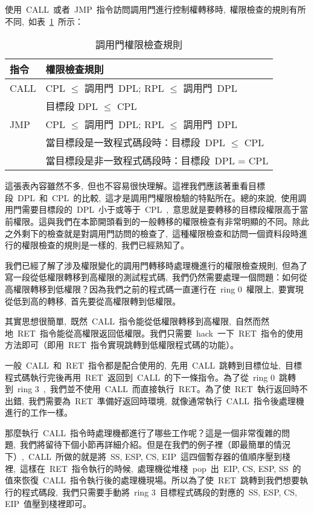 使用~CALL~或者~JMP~指令訪問調用門進行控制權轉移時,~權限檢查的規則有所不同,~如表~\ref{callgate_rules}~所示：

\begin{center}\begin{longtable}{|l|l|}
\caption[]{調用門權限檢查規則}\label{callgate_rules}\\
\hline
\textbf{指令} & \textbf{權限檢查規則}\\
\hline
CALL & CPL $\le$ 調用門~DPL; RPL $\le$ 調用門~DPL\\
     & 目標段 DPL $\le$ CPL\\
\hline
JMP  & CPL $\le$ 調用門~DPL; RPL $\le$ 調用門~DPL\\
     & 當目標段是一致程式碼段時：目標段~DPL $\le$ CPL\\
     & 當目標段是非一致程式碼段時：目標段~DPL = CPL\\
\hline
\end{longtable}\end{center}

這張表內容雖然不多,~但也不容易很快理解。這裡我們應該著重看目標段~DPL~和~CPL~的比較,~這才是調用門權限檢驗的特點所在。總的來說,~使用調用門需要目標段的~DPL~小于或等于~CPL~,~意思就是要轉移的目標段權限高于當前權限。這與我們在本節開頭看到的一般轉移的權限檢查有非常明顯的不同。除此之外剩下的檢查就是對調用門訪問的檢查了,~這種權限檢查和訪問一個資料段時進行的權限檢查的規則是一樣的,~我們已經熟知了。

我們已經了解了涉及權限變化的調用門轉移時處理機進行的權限檢查規則,~但為了寫一段從低權限轉移到高權限的測試程式碼,~我們仍然需要處理一個問題：如何從高權限轉移到低權限？因為我們之前的程式碼一直運行在~ring 0~權限上,~要實現從低到高的轉移,~首先要從高權限轉到低權限。

其實思想很簡單,~既然~CALL~指令能從低權限轉移到高權限,~自然而然地~RET~指令能從高權限返回低權限。我們只需要~hack~一下~RET~指令的使用方法即可（即用~RET~指令實現跳轉到低權限程式碼的功能）。

一般~CALL~和~RET~指令都是配合使用的,~先用~CALL~跳轉到目標位址,~目標程式碼執行完後再用~RET~返回到~CALL~的下一條指令。為了從~ring 0~跳轉到~ring 3~,~我們並不使用~CALL~而直接執行~RET。為了使~RET~執行返回時不出錯,~我們需要為~RET~準備好返回時環境,~就像通常執行~CALL~指令後處理機進行的工作一樣。

那麼執行~CALL~指令時處理機都進行了哪些工作呢？這是一個非常復雜的問題,~我們將留待下個小節再詳細介紹。但是在我們的例子裡（即最簡單的情況下）,~CALL~所做的就是將~SS, ESP, CS, EIP~這四個暫存器的值順序壓到棧裡,~這樣在~RET~指令執行的時候,~處理機從堆棧~pop~出~EIP, CS, ESP, SS~的值來恢復~CALL~指令執行後的處理機現場。所以為了使~RET~跳轉到我們想要執行的程式碼段,~我們只需要手動將~ring 3~目標程式碼段的對應的~SS, ESP, CS, EIP~值壓到棧裡即可。

